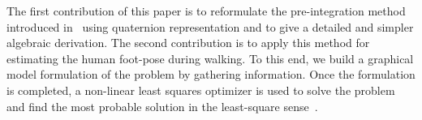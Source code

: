 The first contribution of this paper is to reformulate the pre-integration method introduced in~\cite{forster2015imu} using quaternion representation
and to give a detailed and simpler algebraic derivation.
The second contribution is to apply this method for estimating the human foot-pose during walking.
To this end, we build a graphical model formulation of the problem by gathering information.
Once the formulation is completed, a non-linear least squares optimizer is used to solve the problem and find the most probable solution in the least-square sense~\cite{ceres-solver}.







